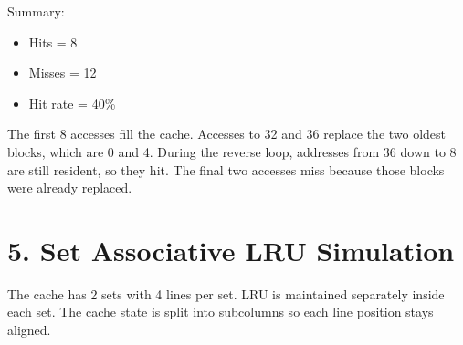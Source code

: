 \documentclass{article}
\begin{document}
Summary:
\begin{itemize}
    \item Hits = 8
    \item Misses = 12
    \item Hit rate = 40\%
\end{itemize}

The first 8 accesses fill the cache. Accesses to 32 and 36 replace the two oldest blocks, which are 0 and 4. During the reverse loop, addresses from 36 down to 8 are still resident, so they hit. The final two accesses miss because those blocks were already replaced.

\section*{5. Set Associative LRU Simulation}
The cache has 2 sets with 4 lines per set. LRU is maintained separately inside each set. The cache state is split into subcolumns so each line position stays aligned.
\end{document}
